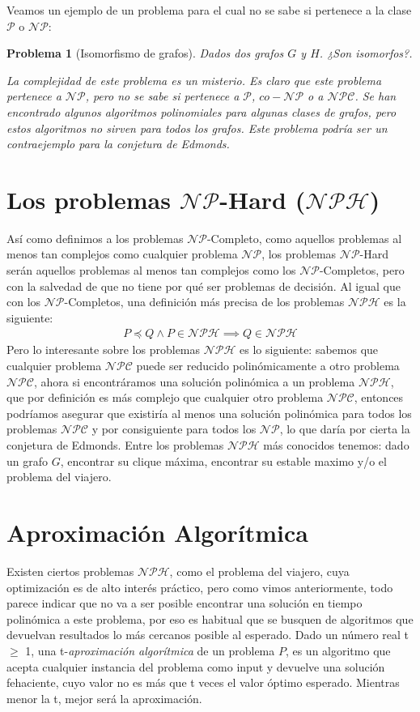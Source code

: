 \documentclass{article}
\newtheorem{problem}{Problema}
\begin{document}
Veamos un ejemplo de un problema para el cual no se sabe si
pertenece a la clase $\mathcal{P}$ o $\mathcal{NP}$:

\begin{problem}[Isomorfismo de grafos]
Dados dos grafos $G$ y $H$. ¿Son isomorfos?.

La complejidad de este problema es un misterio. Es claro que
este problema pertenece a $\mathcal{NP}$, pero no se sabe
si pertenece a $\mathcal{P}$, $co-\mathcal{NP}$ o a $\mathcal{NPC}$.
Se han encontrado algunos algoritmos polinomiales para algunas
clases de grafos, pero estos algoritmos no sirven para todos
los grafos. Este problema podría ser un contraejemplo para
la conjetura de Edmonds.
\end{problem}

\section*{Los problemas $\mathcal{NP}$-Hard ($\mathcal{NPH}$)}
Así como definimos a los problemas $\mathcal{NP}$-Completo, como aquellos problemas al menos tan complejos como cualquier problema $\mathcal{NP}$, los problemas $\mathcal{NP}$-Hard serán aquellos problemas al menos tan complejos como los $\mathcal{NP}$-Completos, pero con la salvedad de que no tiene por qué ser problemas de decisión.
Al igual que con los $\mathcal{NP}$-Completos, una definición más precisa de los problemas $\mathcal{NPH}$ es la siguiente:
\begin{align*}
    P \preceq Q \land P \in \mathcal{NPH} \implies Q\in   \mathcal{NPH}
\end{align*}
Pero lo interesante sobre los problemas $\mathcal{NPH}$ es lo siguiente: sabemos que cualquier problema $\mathcal{NPC}$ puede ser reducido polinómicamente a otro problema $\mathcal{NPC}$, ahora si encontráramos una solución polinómica a un problema $\mathcal{NPH}$, que por definición es más complejo que cualquier otro problema $\mathcal{NPC}$, entonces podríamos asegurar que existiría al menos una solución polinómica para todos los problemas $\mathcal{NPC}$ y por consiguiente para todos los $\mathcal{NP}$, lo que daría por cierta la conjetura de Edmonds.
Entre los problemas $\mathcal{NPH}$ más conocidos tenemos: dado un grafo $G$, encontrar su clique máxima, encontrar su estable maximo y/o el problema del viajero.

\section*{Aproximación Algorítmica}
Existen ciertos problemas $\mathcal{NPH}$, como el problema del viajero, cuya optimización es de alto interés práctico, pero como vimos anteriormente, todo parece indicar que no va a ser posible encontrar una solución en tiempo polinómica a este problema, por eso es habitual que se busquen de algoritmos que devuelvan resultados lo más cercanos posible al esperado.\newline
Dado un número real t $\geq$ 1, una t-\textit{aproximación algorítmica} de un problema $P$, es un algoritmo que acepta cualquier instancia del problema como input y devuelve una solución fehaciente, cuyo valor no es más que t veces el valor óptimo esperado. Mientras menor la t, mejor será la aproximación.
\end{document}
